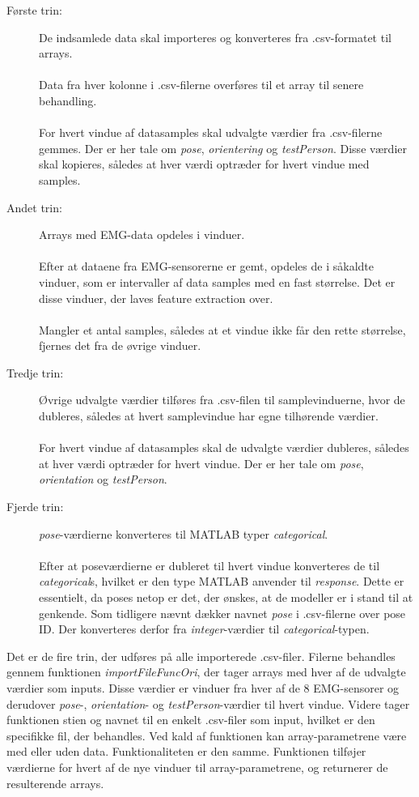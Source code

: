 \begin{description}
	\item[Første trin:] De indsamlede data skal importeres og konverteres fra .csv-formatet til arrays.\\\\
		Data fra hver kolonne i .csv-filerne overføres til et array til senere behandling.
	\\\\
	For hvert vindue af datasamples skal udvalgte værdier fra .csv-filerne gemmes. Der er her tale om \textit{pose}, \textit{orientering} og \textit{testPerson}. Disse værdier skal kopieres, således at hver værdi optræder for hvert vindue med samples.

  \item[Andet trin:] Arrays med EMG-data opdeles i vinduer. 
  \\\\
  Efter at dataene fra EMG-sensorerne er gemt, opdeles de i såkaldte vinduer, som er intervaller af data samples med en fast størrelse. Det er disse vinduer, der laves feature extraction over.
  \\\\
  Mangler et antal samples, således at et vindue ikke får den rette størrelse, fjernes det fra de øvrige vinduer. 
    \item[Tredje trin:] Øvrige udvalgte værdier tilføres fra .csv-filen til samplevinduerne, hvor de dubleres, således at hvert samplevindue har egne tilhørende værdier.
  \\\\
  For hvert vindue af datasamples skal de udvalgte værdier dubleres, således at hver værdi optræder for hvert vindue. Der er her tale om \textit{pose}, \textit{orientation} og \textit{testPerson}.
  
  \item[Fjerde trin:] \textit{pose}-værdierne konverteres til MATLAB typer \textit{categorical}.
  \\\\
  Efter at poseværdierne er dubleret til hvert vindue konverteres de til \textit{categorical}s, hvilket er den type MATLAB anvender til \textit{response}. Dette er essentielt, da poses netop er det, der ønskes, at de modeller er i stand til at genkende. Som tidligere nævnt dækker navnet \textit{pose} i .csv-filerne over pose ID. Der konverteres derfor fra \textit{integer}-værdier til \textit{categorical}-typen. 
\end{description}
Det er de fire trin, der udføres på alle importerede .csv-filer. Filerne behandles gennem funktionen \textit{importFileFuncOri}, der tager arrays med hver af de udvalgte værdier som inputs. Disse værdier er vinduer fra hver af de 8 EMG-sensorer og derudover \textit{pose}-, \textit{orientation}- og \textit{testPerson}-værdier til hvert vindue. Videre tager funktionen stien og navnet til en enkelt .csv-filer som input, hvilket er den specifikke fil, der behandles. Ved kald af funktionen kan array-parametrene være med eller uden data. Funktionaliteten er den samme. Funktionen tilføjer værdierne for hvert af de nye vinduer til array-parametrene, og returnerer de resulterende arrays. 

